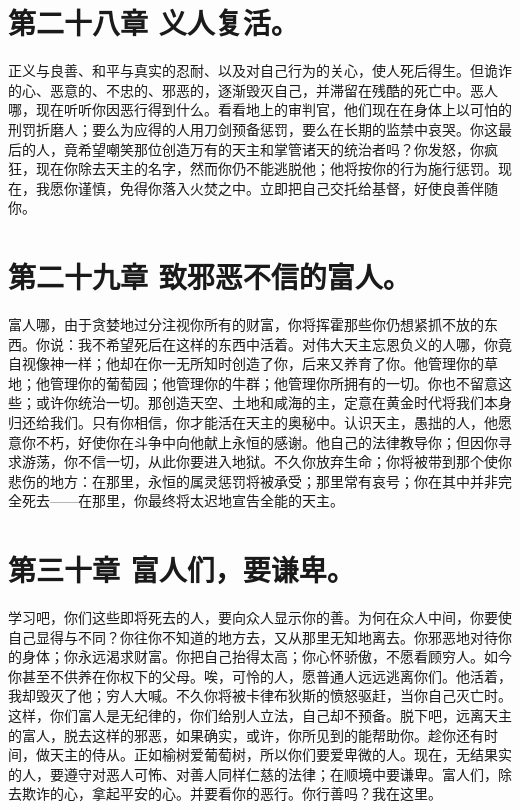 
\section{第二十八章 义人复活。}

正义与良善、和平与真实的忍耐、以及对自己行为的关心，使人死后得生。但诡诈的心、恶意的、不忠的、邪恶的，逐渐毁灭自己，并滞留在残酷的死亡中。恶人哪，现在听听你因恶行得到什么。看看地上的审判官，他们现在在身体上以可怕的刑罚折磨人；要么为应得的人用刀剑预备惩罚，要么在长期的监禁中哀哭。你这最后的人，竟希望嘲笑那位创造万有的天主和掌管诸天的统治者吗？你发怒，你疯狂，现在你除去天主的名字，然而你仍不能逃脱他；他将按你的行为施行惩罚。现在，我愿你谨慎，免得你落入火焚之中。立即把自己交托给基督，好使良善伴随你。\par


\section{第二十九章 致邪恶不信的富人。}

富人哪，由于贪婪地过分注视你所有的财富，你将挥霍那些你仍想紧抓不放的东西。你说：我不希望死后在这样的东西中活着。对伟大天主忘恩负义的人哪，你竟自视像神一样；他却在你一无所知时创造了你，后来又养育了你。他管理你的草地；他管理你的葡萄园；他管理你的牛群；他管理你所拥有的一切。你也不留意这些；或许你统治一切。那创造天空、土地和咸海的主，定意在黄金时代将我们本身归还给我们。只有你相信，你才能活在天主的奥秘中。认识天主，愚拙的人，他愿意你不朽，好使你在斗争中向他献上永恒的感谢。他自己的法律教导你；但因你寻求游荡，你不信一切，从此你要进入地狱。不久你放弃生命；你将被带到那个使你悲伤的地方：在那里，永恒的属灵惩罚将被承受；那里常有哀号；你在其中并非完全死去——在那里，你最终将太迟地宣告全能的天主。\par


\section{第三十章 富人们，要谦卑。}

学习吧，你们这些即将死去的人，要向众人显示你的善。为何在众人中间，你要使自己显得与不同？你往你不知道的地方去，又从那里无知地离去。你邪恶地对待你的身体；你永远渴求财富。你把自己抬得太高；你心怀骄傲，不愿看顾穷人。如今你甚至不供养在你权下的父母。唉，可怜的人，愿普通人远远逃离你们。他活着，我却毁灭了他；穷人大喊。不久你将被卡律布狄斯的愤怒驱赶，当你自己灭亡时。这样，你们富人是无纪律的，你们给别人立法，自己却不预备。脱下吧，远离天主的富人，脱去这样的邪恶，如果确实，或许，你所见到的能帮助你。趁你还有时间，做天主的侍从。正如榆树爱葡萄树，所以你们要爱卑微的人。现在，无结果实的人，要遵守对恶人可怖、对善人同样仁慈的法律；在顺境中要谦卑。富人们，除去欺诈的心，拿起平安的心。并要看你的恶行。你行善吗？我在这里。\par

